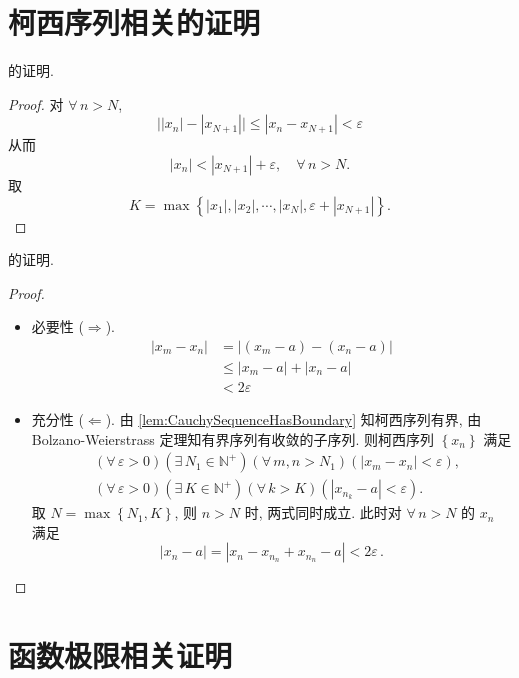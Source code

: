 \documentclass{book}
\newcommand{\Exists}{\exists\,}
\newcommand{\Any}{\forall\,}
\newcommand{\set}[1]{\left\{#1\right\}}
\newcommand{\abs}[1]{\left\lvert #1 \right\rvert}
\newcommand{\N}{\mathbb{N}}
\renewcommand{\le}{\leqslant}
\numberwithin{equation}{section}
\numberwithin{figure}{section}
\theoremstyle{definition}
\begin{document}
\section{柯西序列相关的证明}
\label{proof:CauchySequence}
 的证明.
\begin{proof}
  对 $\Any n>N$, 
  \begin{equation*}
    \big\lvert\abs{x_n}-\abs{x_{N+1}}\big\rvert\le\abs{x_n-x_{N+1}}<\varepsilon
  \end{equation*}
  从而
  \begin{equation*}
    \abs{x_n}<\abs{x_{N+1}}+\varepsilon,\quad\Any n>N.
  \end{equation*}
  取
  \begin{equation*}
    K=\max\set{\abs{x_1},\abs{x_2},\cdots,\abs{x_N},\varepsilon+\abs{x_{N+1}}}.
  \end{equation*}
\end{proof}

 的证明.
\begin{proof}
  \leavevmode

  \begin{itemize}
    \item 必要性 ($\Rightarrow$).
      \begin{align*}
	\abs{x_m-x_n}
	&=\abs{(x_m-a)-(x_n-a)}\\
	&\le\abs{x_m-a}+\abs{x_n-a}\\
	&<2\varepsilon
      \end{align*}
    \item 充分性 ($\Leftarrow$). 由 \cref{lem:CauchySequenceHasBoundary} 知柯西序列有界, 由 Bolzano-Weierstrass 定理知有界序列有收敛的子序列. 则柯西序列 $\set{x_n}$ 满足
      \begin{align*}
	&(\Any \varepsilon>0)(\Exists N_1\in\N^+)(\Any m,n>N_1)(\abs{x_m-x_n}<\varepsilon),\\
	&(\Any \varepsilon>0)(\Exists K\in\N^+)(\Any k>K)(\abs{x_{n_k}-a}<\varepsilon).
      \end{align*}
      取 $N=\max\set{N_1,K}$, 则 $n>N$ 时, 两式同时成立. 此时对 $\Any n>N$ 的 $x_n$ 满足
      \begin{equation*}
	\abs{x_n-a}=\abs{x_n-x_{n_n}+x_{n_n}-a}<2\varepsilon\,.
      \end{equation*}
  \end{itemize}
\end{proof}

\section{函数极限相关证明}
\end{document}
